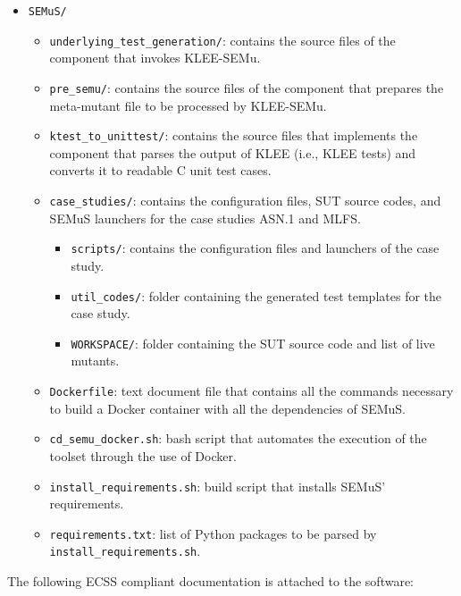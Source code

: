 \begin{itemize}
  \item \texttt{SEMuS/}
  \begin{itemize}
    \item \texttt{underlying\_test\_generation/}: contains the source files of the component that invokes KLEE-SEMu.
    \item \texttt{pre\_semu/}: contains the source files of the component that prepares the meta-mutant file to be processed by KLEE-SEMu.
    \item \texttt{ktest\_to\_unittest/}: contains the source files that implements the component that parses the output of KLEE (i.e., KLEE tests) and converts it to readable C unit test cases.
    \item \texttt{case\_studies/}: contains the configuration files, SUT source codes, and SEMuS launchers for the case studies ASN.1 and MLFS.
    \begin{itemize}
      \item \texttt{scripts/}: contains the configuration files and launchers of the case study.
      \item \texttt{util\_codes/}: folder containing the generated test templates for the case study.
      \item \texttt{WORKSPACE/}: folder containing the SUT source code and list of live mutants.
    \end{itemize}
    \item \texttt{Dockerfile}: text document file that contains all the commands necessary to build a Docker container with all the dependencies of SEMuS.
    \item \texttt{cd\_semu\_docker.sh}: bash script that automates the execution of the toolset through the use of Docker.
    \item \texttt{install\_requirements.sh}: build script that installs SEMuS' requirements.
    \item \texttt{requirements.txt}: list of Python packages to be parsed by \texttt{install\_requirements.sh}.
  \end{itemize}
\end{itemize}

The following ECSS compliant documentation is attached to the software:

